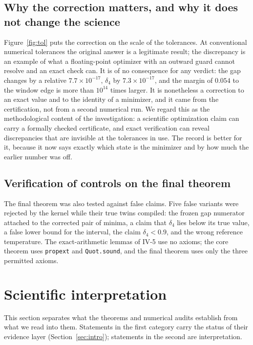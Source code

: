 \documentclass[11pt,a4paper]{article}
\theoremstyle{plain}
\theoremstyle{definition}
\theoremstyle{remark}
\newcommand{\lean}[1]{\nolinkurl{#1}}
\begin{document}
\subsection{Why the correction matters, and why it does not change the science}
Figure~\ref{fig:tol} puts the correction on the scale of the tolerances. At conventional numerical tolerances the original answer is a legitimate result; the discrepancy is an example of what a floating-point optimizer with an outward guard cannot resolve and an exact check can. It is of no consequence for any verdict: the gap changes by a relative $7.7\times10^{-17}$, $\delta_4$ by $7.3\times10^{-17}$, and the margin of $0.054$ to the window edge is more than $10^{14}$ times larger. It is nonetheless a correction to an exact value and to the identity of a minimizer, and it came from the certification, not from a second numerical run. We regard this as the methodological content of the investigation: a scientific optimization claim can carry a formally checked certificate, and exact verification can reveal discrepancies that are invisible at the tolerances in use. The record is better for it, because it now says exactly which state is the minimizer and by how much the earlier number was off.

\subsection{Verification of controls on the final theorem}
The final theorem was also tested against false claims. Five false variants were rejected by the kernel while their true twins compiled: the frozen gap numerator attached to the corrected pair of minima, a claim that $\delta_4$ lies below its true value, a false lower bound for the interval, the claim $\delta_4<0.9$, and the wrong reference temperature. The exact-arithmetic lemmas of IV-5 use no axioms; the core theorem uses \lean{propext} and \lean{Quot.sound}, and the final theorem uses only the three permitted axioms.

\section{Scientific interpretation}\label{sec:interp}

This section separates what the theorems and numerical audits establish from what we read into them. Statements in the first category carry the status of their evidence layer (Section~\ref{sec:intro}); statements in the second are interpretation.
\end{document}
